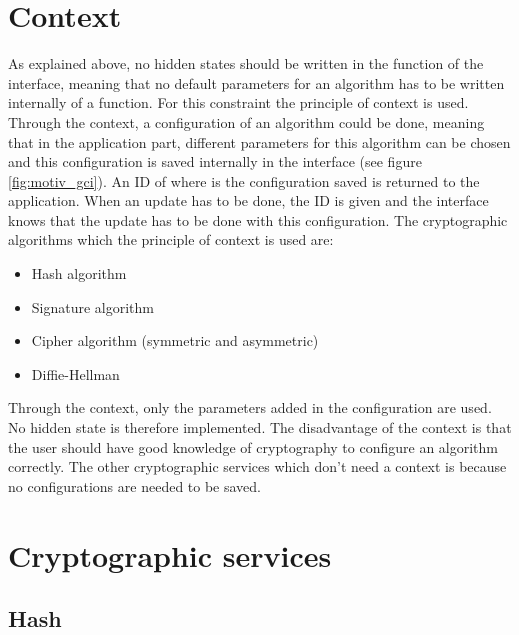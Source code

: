 \section{Context}
\label{gci_ctx}
As explained above, no hidden states should be written in the function of the
interface, meaning that no default parameters for an algorithm has to be written
internally of a function.\newline
For this constraint the principle of context is used.\newline
Through the context, a configuration of an algorithm could be done, meaning that
in the application part, different parameters for this
algorithm can be chosen and this configuration is saved internally in the
interface (see figure \ref{fig:motiv_gci}).\newline
An ID of where is the configuration saved is returned to the application.\newline
When an update has to be done, the ID is given and the interface knows that the
update has to be done with this configuration.\newline
The cryptographic algorithms which the principle of context is used are:
\begin{itemize}
  \item Hash algorithm
  \item Signature algorithm
  \item Cipher algorithm (symmetric and asymmetric)
  \item Diffie-Hellman\newline
\end{itemize}
Through the context, only the parameters added in the configuration are used. No
hidden state is therefore implemented.\newline
The disadvantage of the context is that the user should have good knowledge
of cryptography to configure an algorithm correctly.
The other cryptographic services which don't need a context is because no
configurations are needed to be saved.
\newpage
\section{Cryptographic services}
\subsection{Hash}
\label{gci_hash}

